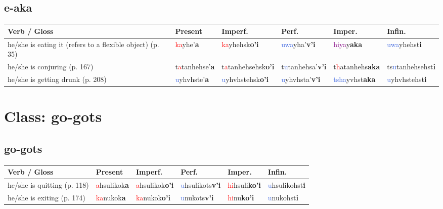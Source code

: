 \documentclass[oneside,openany]{book}%
\begin{document}
\subsection*{e-aka}%
\begin{tabularx}{\textwidth}{>{\hsize=1.5\hsize\RaggedRight}X >{\hsize=0.9\hsize}X >{\hsize=0.9\hsize}X >{\hsize=0.9\hsize}X >{\hsize=0.9\hsize}X >{\hsize=0.9\hsize}X}%
\toprule%
\textbf{Verb / Gloss}&\textbf{Present}&\textbf{Imperf.}&\textbf{Perf.}&\textbf{Imper.}&\textbf{Infin.}\\%
\midrule%
he/she is eating it (refers to a flexible object) (p. 35)&\textcolor{Red}{ka}yhe'\textbf{a}&\textcolor{Red}{ka}yhehsk\textbf{o'i}&\textcolor{RoyalBlue}{uwa}yha'\textbf{v'i}&\textcolor{Purple}{hiya}y\textbf{aka}&\textcolor{RoyalBlue}{uwa}yhehst\textbf{i}\\%
he/she is conjuring (p. 167)&t\textcolor{Red}{a}tanhehse'\textbf{a}&t\textcolor{Red}{a}tanhehsehsk\textbf{o'i}&t\textcolor{RoyalBlue}{u}tanhehsa'\textbf{v'i}&t\textcolor{Red}{h}atanhehs\textbf{aka}&ts\textcolor{RoyalBlue}{u}tanhehsehst\textbf{i}\\%
he/she is getting drunk (p. 208)&\textcolor{RoyalBlue}{u}yhvhste'\textbf{a}&\textcolor{RoyalBlue}{u}yhvhstehsk\textbf{o'i}&\textcolor{RoyalBlue}{u}yhvhsta'\textbf{v'i}&\textcolor{RoyalBlue}{tsha}yvhst\textbf{aka}&\textcolor{RoyalBlue}{u}yhvhstehst\textbf{i}\\%
\bottomrule%
\end{tabularx}%
\vspace{1em}%
\needspace{3in}%
\section*{Class: go-gots}%
%
\needspace{1in}%
\subsection*{go-gots}%
\begin{tabularx}{\textwidth}{>{\hsize=1.5\hsize\RaggedRight}X >{\hsize=0.9\hsize}X >{\hsize=0.9\hsize}X >{\hsize=0.9\hsize}X >{\hsize=0.9\hsize}X >{\hsize=0.9\hsize}X}%
\toprule%
\textbf{Verb / Gloss}&\textbf{Present}&\textbf{Imperf.}&\textbf{Perf.}&\textbf{Imper.}&\textbf{Infin.}\\%
\midrule%
he/she is quitting (p. 118)&\textcolor{Red}{a}hsulikok\textbf{a}&\textcolor{Red}{a}hsulikok\textbf{o'i}&\textcolor{RoyalBlue}{u}hsulikots\textbf{v'i}&\textcolor{Red}{hi}hsuli\textbf{ko'i}&\textcolor{RoyalBlue}{u}hsulikohst\textbf{i}\\%
he/she is exiting (p. 174)&\textcolor{Red}{ka}nukok\textbf{a}&\textcolor{Red}{ka}nukok\textbf{o'i}&\textcolor{RoyalBlue}{u}nukots\textbf{v'i}&\textcolor{Red}{hi}nu\textbf{ko'i}&\textcolor{RoyalBlue}{u}nukohst\textbf{i}\\%
\bottomrule%
\end{tabularx}%
\vspace{1em}%
\needspace{3in}%
\end{document}
